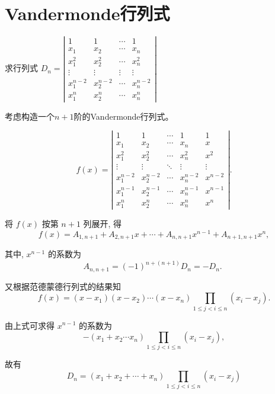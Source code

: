 \section{Vandermonde行列式}

\begin{example}
    求行列式 $D_{n}=\left|\begin{array}{cccc}
        1 & 1 & \cdots & 1 \\
        x_{1} & x_{2} & \cdots & x_{n} \\
        x_{1}^{2} & x_{2}^{2} & \cdots & x_{n}^{2} \\
        \vdots & \vdots & \vdots & \vdots \\
        x_{1}^{n-2} & x_{2}^{n-2} & \cdots & x_{n}^{n-2} \\
        x_{1}^{n} & x_{2}^{n} & \cdots & x_{n}^{n}
        \end{array}\right|$
\end{example}

\begin{solution}
    考虑构造一个$n+1$阶的Vandermonde行列式。

$$
f(x)=\left|\begin{array}{ccccc}
1 & 1 & \cdots & 1 & 1 \\
x_{1} & x_{2} & \cdots & x_{n} & x \\
x_{1}^{2} & x_{2}^{2} & \cdots & x_{n}^{2} & x^{2} \\
\vdots & \vdots & \ddots & \vdots & \vdots \\
x_{1}^{n-2} & x_{2}^{n-2} & \cdots & x_{n}^{n-2} & x^{n-2} \\
x_{1}^{n-1} & x_{2}^{n-1} & \cdots & x_{n}^{n-1} & x^{n-1} \\
x_{1}^{n} & x_{2}^{n} & \cdots & x_{n}^{n} & x^{n}
\end{array}\right| .
$$

将 $f(x)$ 按第 $n+1$ 列展开, 得
$$
f(x)=A_{1, n+1}+A_{2, n+1} x+\cdots+A_{n, n+1} x^{n-1}+A_{n+1, n+1} x^{n},
$$

其中, $x^{n-1}$ 的系数为
$$
A_{n, n+1}=(-1)^{n+(n+1)} D_{n}=-D_{n} \text {. }
$$

又根据范德蒙德行列式的结果知
$$
f(x)=\left(x-x_{1}\right)\left(x-x_{2}\right) \cdots\left(x-x_{n}\right) \prod_{1 \leq j<i \leq n}\left(x_{i}-x_{j}\right) .
$$

由上式可求得 $x^{n-1}$ 的系数为
$$
-\left(x_{1}+x_{2} \cdots x_{n}\right) \prod_{1 \leq j<i \leq n}\left(x_{i}-x_{j}\right),
$$

故有
$$
D_{n}=\left(x_{1}+x_{2}+\cdots+x_{n}\right) \prod_{1 \leq j<i \leq n}\left(x_{i}-x_{j}\right)
$$
\end{solution}

